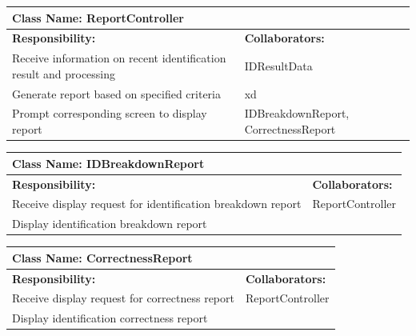 \documentclass[]{article}
\begin{document}
	\begin{table}[ht]
		\centering
		\begin{tabular}{|p{5cm}|p{5cm}|}
		\hline 
		 \multicolumn{2}{|l|}{\textbf{Class Name: ReportController}} \\
		\hline
		\textbf{Responsibility:} & \textbf{Collaborators:} \\
		\hline
		Receive information on recent identification result and processing & IDResultData \\
		\hline
		Generate report based on specified criteria & xd \\
		\hline
		Prompt corresponding screen to display report & IDBreakdownReport, CorrectnessReport \\
		\hline
		\end{tabular}
	\end{table}
	
	\begin{table}[ht]
		\centering
		\begin{tabular}{|p{5cm}|p{5cm}|}
		\hline 
		 \multicolumn{2}{|l|}{\textbf{Class Name: IDBreakdownReport}} \\
		\hline
		\textbf{Responsibility:} & \textbf{Collaborators:} \\
		\hline
		Receive display request for identification breakdown report & ReportController \\
		\hline
		Display identification breakdown report &  \\
		\hline
		\end{tabular}
	\end{table}
	
\newpage
	\begin{table}[ht]
		\centering
		\begin{tabular}{|p{5cm}|p{5cm}|}
		\hline 
		 \multicolumn{2}{|l|}{\textbf{Class Name: CorrectnessReport}} \\
		\hline
		\textbf{Responsibility:} & \textbf{Collaborators:} \\
		\hline
		Receive display request for correctness report & ReportController \\
		\hline
		Display identification correctness report &  \\
		\hline
		\end{tabular}
	\end{table}
	
\newpage
\newpage
\appendix
\end{document}

